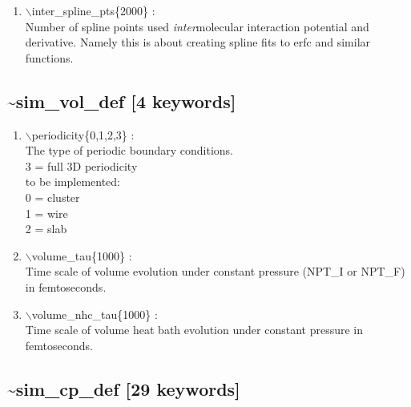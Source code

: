 \documentclass[12pt,titlepage]{article}
\begin{document}
\begin{enumerate}
 \vspace{0.15in} 
 \item   $\backslash$inter\_spline\_pts\{2000\} : \\
    Number of spline points used {\it inter}molecular interaction 
    potential and derivative.  Namely this is about creating spline fits to erfc and similar functions.

\end{enumerate}

\newpage
\subsection*{\bf \~{}sim\_vol\_def [4 keywords]}

\begin{enumerate}

\vspace{0.15in} 
 \item  $\backslash$periodicity\{0,1,2,3\} : \\
       The type of periodic boundary conditions.\\
	3 = full 3D periodicity\\
	to be implemented:\\
       0 = cluster\\
       1 = wire\\
       2 = slab


 \vspace{0.15in} 
 \item  $\backslash$volume\_tau\{1000\} : \\
     Time scale of volume evolution
     under constant pressure (NPT\_I or NPT\_F) in femtoseconds.
  
 \vspace{0.15in} 
 \item  $\backslash$volume\_nhc\_tau\{1000\} : \\
     Time scale of volume 
     heat bath evolution under constant pressure in femtoseconds.

\end{enumerate}

\newpage
\subsection*{\bf \~{}sim\_cp\_def [29 keywords]}
\end{document}
